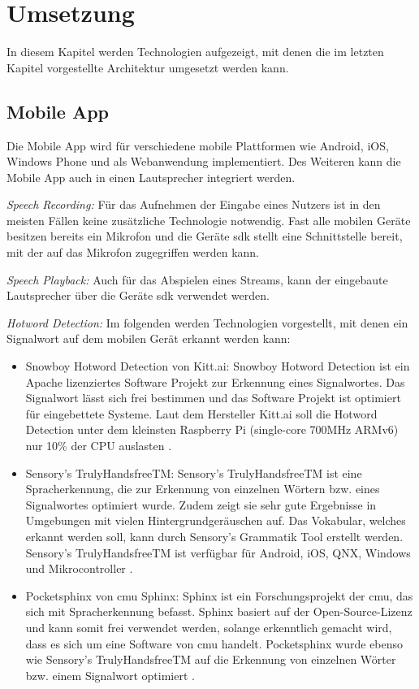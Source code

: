 \section{Umsetzung}\label{sec:umsetzung}
In diesem Kapitel werden Technologien aufgezeigt, mit denen die im letzten Kapitel vorgestellte Architektur umgesetzt werden kann. 

\subsection{Mobile App}
Die Mobile App wird für verschiedene mobile Plattformen wie Android, iOS, Windows Phone und als Webanwendung implementiert. Des Weiteren kann die Mobile App auch in einen Lautsprecher integriert werden. 
\begin{description}
	\item \textit{Speech Recording:} Für das Aufnehmen der Eingabe eines Nutzers ist in den meisten Fällen keine zusätzliche Technologie notwendig. Fast alle mobilen Geräte besitzen bereits ein Mikrofon und die Geräte \acs{sdk} stellt eine Schnittstelle bereit, mit der auf das Mikrofon zugegriffen werden kann.
	\item \textit{Speech Playback:} Auch für das Abspielen eines Streams, kann der eingebaute Lautsprecher über die Geräte \acs{sdk} verwendet werden.
	\item \textit{Hotword Detection:} Im folgenden werden Technologien vorgestellt, mit denen ein Signalwort auf dem mobilen Gerät erkannt werden kann: 
	\begin{itemize}
		\item Snowboy Hotword Detection von Kitt.ai: Snowboy Hotword Detection ist ein Apache lizenziertes Software Projekt zur Erkennung eines Signalwortes. Das Signalwort lässt sich frei bestimmen und das Software Projekt ist optimiert für eingebettete Systeme. Laut dem Hersteller Kitt.ai soll die Hotword Detection unter dem kleinsten Raspberry Pi (single-core 700MHz ARMv6) nur 10\% der CPU
		auslasten \cite{SnowboyHotwordDetection}.
		\item Sensory's TrulyHandsfreeTM: Sensory's TrulyHandsfreeTM ist eine Spracherkennung, die zur Erkennung von einzelnen Wörtern bzw. eines Signalwortes optimiert wurde. Zudem zeigt sie sehr gute Ergebnisse in Umgebungen mit vielen Hintergrundgeräuschen auf. Das Vokabular, welches erkannt werden soll, kann durch Sensory's Grammatik Tool erstellt werden. Sensory's TrulyHandsfreeTM ist verfügbar für Android, iOS, QNX, Windows und Mikrocontroller \cite{TrulyHandsfreeTM}.
		\item Pocketsphinx von \acs{cmu} Sphinx: Sphinx ist ein Forschungsprojekt der \ac{cmu}, das sich mit Spracherkennung befasst. Sphinx basiert auf der Open-Source-Lizenz und kann somit frei verwendet werden, solange erkenntlich gemacht wird, dass es sich um eine Software von \ac{cmu} handelt. Pocketsphinx wurde ebenso wie Sensory's TrulyHandsfreeTM auf die Erkennung von einzelnen Wörter bzw. einem Signalwort optimiert \cite{Pocketsphinx}.
	\end{itemize}
\end{description}

